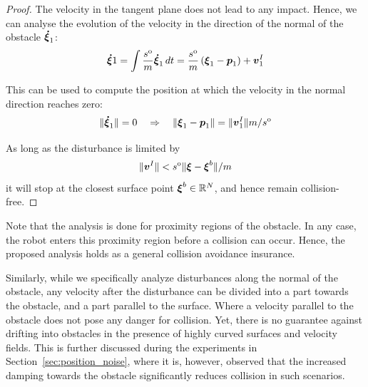 \begin{proof}

The velocity in the tangent plane does not lead to any impact. Hence, we can analyse the evolution of the velocity in the direction of the normal of the obstacle $\boldsymbol{\dot \xi}_1$:
\begin{equation}
    \vecs{\dot \xi}1 = \int \frac{s^{\mathrm{o}}}{m} \vecs{ \dot \xi}_1 \, dt = \frac{s^{\mathrm{o}}}{m} \left(\vecs{\xi}_1 - \vect p_1 \right)  + \vecs v^I_1 \label{eq:velocity_with_control}
\end{equation}

This can be used to compute the position at which the velocity in the normal direction reaches zero:
\begin{equation}
    \| \boldsymbol{\dot \xi} _1 \| = 0
    \quad \Rightarrow \quad
    \| \boldsymbol{\xi}_1 -  \boldsymbol{p}_1 \| = \| \boldsymbol{v}^I_1 \| {m} / {s^{\mathrm{o}}} 
\end{equation}

As long as the disturbance is limited by
\begin{equation}
    \| \boldsymbol{v}^I \| < s^{\mathrm{o}} \| \boldsymbol{\xi} - \boldsymbol{\xi}^b \| / m
\end{equation}
it will stop at the closest surface point $\boldsymbol{\xi}^b \in \mathbb{R}^N$, and hence remain collision-free.
\end{proof}

Note that the analysis is done for proximity regions of the obstacle. In any case, the robot enters this proximity region before a collision can occur. Hence, the proposed analysis holds as a general collision avoidance insurance.

Similarly, while we specifically analyze disturbances along the normal of the obstacle, any velocity after the disturbance can be divided into a part towards the obstacle, and a part parallel to the surface. Where a velocity parallel to the obstacle does not pose any danger for collision.
Yet, there is no guarantee against drifting into obstacles in the presence of highly curved surfaces and velocity fields. This is further discussed during the experiments in Section~\ref{sec:position_noise}, where it is, however, observed that the increased damping towards the obstacle significantly reduces collision in such scenarios. 

